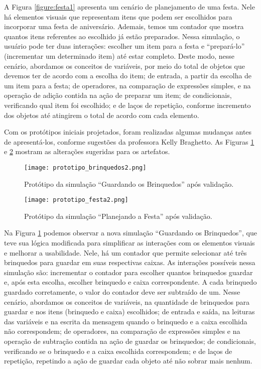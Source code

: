 A Figura \ref{figure:festa1} apresenta um cenário de planejamento de uma festa. Nele há elementos visuais que representam itens que podem ser escolhidos para incorporar uma festa de aniversário. Ademais, temos um contador que mostra quantos itens referentes ao escolhido já estão preparados. Nessa simulação, o usuário pode ter duas interações: escolher um item para a festa e \enquote{prepará-lo} (incrementar um determinado item) até estar completo. Deste modo, nesse cenário, abordamos os conceitos de variáveis, por meio do total de objetos que devemos ter de acordo com a escolha do item; de entrada, a partir da escolha de um item para a festa; de operadores, na comparação de expressões simples, e na operação de adição contida na ação de preparar um item; de condicionais, verificando qual item foi escolhido; e de laços de repetição, conforme incremento dos objetos até atingirem o total de acordo com cada elemento.

Com os protótipos iniciais projetados, foram realizadas algumas mudanças antes de apresentá-los, conforme sugestões da professora Kelly Braghetto. As Figuras \ref{figure:brinquedos2} e \ref{figure:festa2} mostram as alterações sugeridas para os artefatos.

\begin{figure}[h!]
    \centering
    \texttt{[image: prototipo\_brinquedos2.png]}
    \caption{Protótipo da simulação \enquote{Guardando os Brinquedos} após validação.}
    \label{figure:brinquedos2}
\end{figure}

\begin{figure}[h!]
    \centering
    \texttt{[image: prototipo\_festa2.png]}
    \caption{Protótipo da simulação \enquote{Planejando a Festa} após validação.}
    \label{figure:festa2}
\end{figure}

Na Figura \ref{figure:brinquedos2} podemos observar a nova simulação \enquote{Guardando os Brinquedos}, que teve sua lógica modificada para simplificar as interações com os elementos visuais e melhorar a usabilidade. Nele, há um contador que permite selecionar até três brinquedos para guardar em suas respectivas caixas. As interações possíveis nessa simulação são: incrementar o contador para escolher quantos brinquedos guardar e, após esta escolha, escolher brinquedo e caixa correspondente. A cada brinquedo guardado corretamente, o valor do contador deve ser subtraído de um. Nesse cenário, abordamos os conceitos de variáveis, na quantidade de brinquedos para guardar e nos itens (brinquedo e caixa) escolhidos; de entrada e saída, na leituras das variáveis e na escrita da mensagem quando o brinquedo e a caixa escolhida não correspondem; de operadores, na comparação de expressões simples e na operação de subtração contida na ação de guardar os brinquedos; de condicionais, verificando se o brinquedo e a caixa escolhida correspondem; e de laços de repetição, repetindo a ação de guardar cada objeto até não sobrar mais nenhum.

